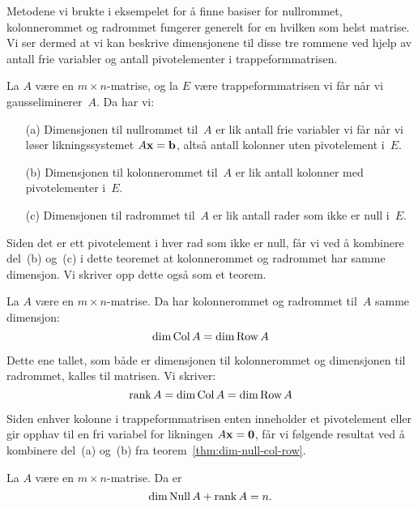 Metodene vi brukte i eksempelet for å finne basiser for nullrommet,
kolonnerommet og radrommet fungerer generelt for en hvilken som helst
matrise.  Vi ser dermed at vi kan beskrive dimensjonene til disse tre
rommene ved hjelp av antall frie variabler og antall pivotelementer i
trappeformmatrisen.


\begin{thm}
\label{thm:dim-null-col-row}
La $A$ være en $m \times n$-matrise, og la $E$ være trappeformmatrisen
vi får når vi gausseliminerer~$A$.  Da har vi:
\begin{enumerate}
\item[(a)] Dimensjonen til nullrommet til~$A$ er lik antall frie
variabler vi får når vi løser likningssystemet $A \mathbf{x} = \mathbf{b}$, altså
antall kolonner uten pivotelement i~$E$.
\item[(b)] Dimensjonen til kolonnerommet til~$A$ er lik antall kolonner
med pivotelementer i~$E$.
\item[(c)] Dimensjonen til radrommet til~$A$ er lik antall rader som
ikke er null i~$E$.
\end{enumerate}
\end{thm}

Siden det er ett pivotelement i hver rad som ikke er null, får vi ved
å kombinere del~(b) og~(c) i dette teoremet at kolonnerommet og
radrommet har samme dimensjon.  Vi skriver opp dette også som et
teorem.

\begin{thm}
\label{thm:dim-row=dim-col}
La $A$ være en $m \times n$-matrise.  Da har kolonnerommet og
radrommet til~$A$ samme dimensjon:
\[
\dim \operatorname{Col} A = \dim \operatorname{Row} A
\]
\end{thm}

Dette ene tallet, som både er dimensjonen til kolonnerommet og
dimensjonen til radrommet, kalles  til matrisen.  Vi
skriver:
\[
\operatorname{rank} A = \dim \operatorname{Col} A = \dim \operatorname{Row} A
\]

Siden enhver kolonne i trappeformmatrisen enten inneholder et
pivotelement eller gir opphav til en fri variabel for likningen
$A \mathbf{x} = \mathbf{0}$, får vi følgende resultat ved å kombinere del~(a) og~(b)
fra teorem~\ref{thm:dim-null-col-row}.

\begin{thm}
La $A$ være en $m \times n$-matrise.  Da er
\[
\dim \operatorname{Null} A + \operatorname{rank} A = n.
\]
\end{thm}


\kapittelslutt
